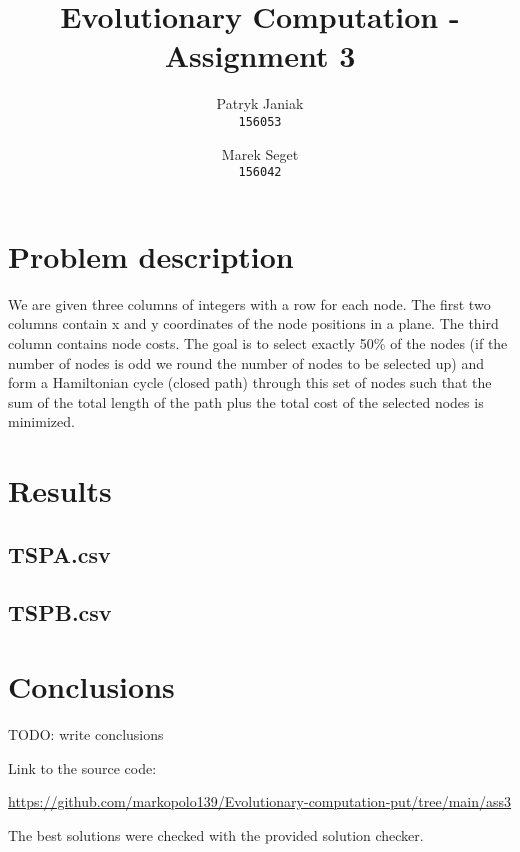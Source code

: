 \documentclass{article}
\title{Evolutionary Computation - Assignment 3}
\author{
  Patryk Janiak\\
  \texttt{156053}
  \and
  Marek Seget\\
  \texttt{156042}
}
\begin{document}
\maketitle

\section{Problem description}
We are given three columns of integers with a row for each node. The first two columns contain x
and y coordinates of the node positions in a plane. The third column contains node costs. The goal is
to select exactly 50\% of the nodes (if the number of nodes is odd we round the number of nodes to
be selected up) and form a Hamiltonian cycle (closed path) through this set of nodes such that the
sum of the total length of the path plus the total cost of the selected nodes is minimized.



\section{Results}





\subsection{TSPA.csv}



\subsection{TSPB.csv}



\newpage

\section{Conclusions}

TODO: write conclusions

Link to the source code:

\url{https://github.com/markopolo139/Evolutionary-computation-put/tree/main/ass3}

The best solutions were checked with the provided solution checker.
\end{document}
